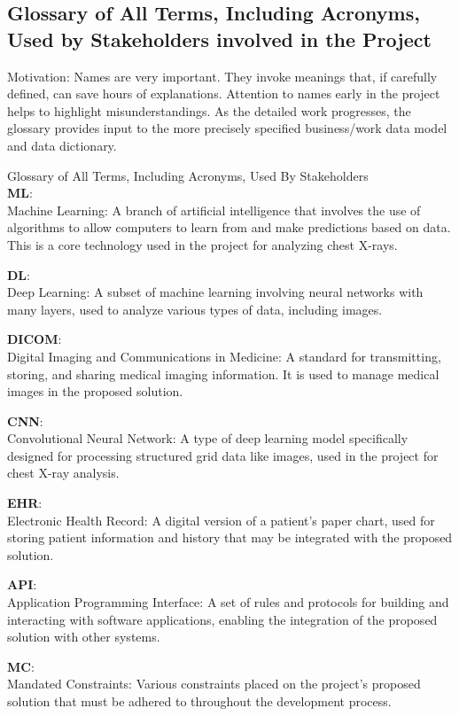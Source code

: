 \documentclass[12pt]{article}
\begin{document}
\subsection{Glossary of All Terms, Including Acronyms, Used by Stakeholders
involved in the Project}
Motivation: Names are very important. They invoke meanings that, if carefully defined, can save 
hours of explanations. Attention to names early in the project helps to highlight 
misunderstandings. As the detailed work progresses, the glossary provides input to the more 
precisely specified business/work data model and data dictionary.

Glossary of All Terms, Including Acronyms, Used By Stakeholders\\

\textbf{ML}:\\
Machine Learning: A branch of artificial intelligence that involves the use of algorithms to allow 
computers to learn from and make predictions based on data. This is a core technology used in the 
project for analyzing chest X-rays.

\textbf{DL}:\\
Deep Learning: A subset of machine learning involving neural networks with many layers, used to 
analyze various types of data, including images.

\textbf{DICOM}:\\
Digital Imaging and Communications in Medicine: A standard for transmitting, storing, and sharing 
medical imaging information. It is used to manage medical images in the proposed solution.

\textbf{CNN}:\\
Convolutional Neural Network: A type of deep learning model specifically designed for processing 
structured grid data like images, used in the project for chest X-ray analysis.

\textbf{EHR}:\\
Electronic Health Record: A digital version of a patient's paper chart, used for storing patient 
information and history that may be integrated with the proposed solution.

\textbf{API}:\\
Application Programming Interface: A set of rules and protocols for building and interacting with 
software applications, enabling the integration of the proposed solution with other systems.

\textbf{MC}:\\
Mandated Constraints: Various constraints placed on the project’s proposed solution that must be 
adhered to throughout the development process.
\end{document}
